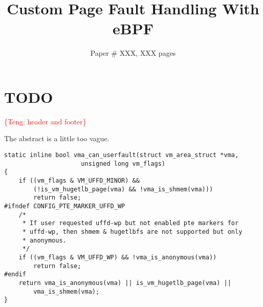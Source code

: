 \documentclass[sigconf]{acmart}
\newcommand{\teng}[1]{\textcolor{red}{\{Teng: #1\}}}
\newcommand{\teng}[1]{}
\begin{document}
\title{Custom Page Fault Handling With eBPF}

\author{Paper \# XXX, XXX pages}

\renewcommand{\shortauthors}{X.et al.}





\maketitle






% 


\section{TODO}
\teng{header and footer}

The abstract is a little too vague.
\begin{lstlisting}
static inline bool vma_can_userfault(struct vm_area_struct *vma,
				     unsigned long vm_flags)
{
	if ((vm_flags & VM_UFFD_MINOR) &&
	    (!is_vm_hugetlb_page(vma) && !vma_is_shmem(vma)))
		return false;
#ifndef CONFIG_PTE_MARKER_UFFD_WP
	/*
	 * If user requested uffd-wp but not enabled pte markers for
	 * uffd-wp, then shmem & hugetlbfs are not supported but only
	 * anonymous.
	 */
	if ((vm_flags & VM_UFFD_WP) && !vma_is_anonymous(vma))
		return false;
#endif
	return vma_is_anonymous(vma) || is_vm_hugetlb_page(vma) ||
	    vma_is_shmem(vma);
}

\end{lstlisting}




\end{document}
